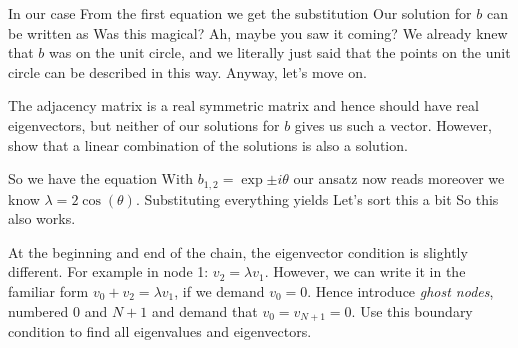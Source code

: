 In our case 
From the first equation we get the substitution 
\eq{
\lambda = 2 \cos(\theta)
}
Our solution for $b$ can be written as 
Was this magical? Ah, maybe you saw it coming? We already knew that $b$ was on the unit circle, and we literally just said that the points on the unit circle can be described in this way. Anyway, let's move on.  

\subquestion  
The adjacency matrix is a real symmetric matrix and hence should have real eigenvectors, but neither of our solutions for $b$ gives us such a vector. However, show that a linear combination of the solutions is also a solution.

\solution 
So we have the equation 
With $b_{1,2}=\exp{\pm i \theta}$ our ansatz now reads 
moreover we know $\lambda=2\cos(\theta)$. Substituting everything yields 
Let's sort this a bit 
So this also works. 

\subquestion At the beginning and end of the chain, the eigenvector condition is slightly different. For example in node 1: $v_2=\lambda v_1$. However, we can write it in the familiar form $v_0+v_2=\lambda v_1$, if we demand $v_0=0$. Hence introduce \textit{ghost nodes}, numbered 0 and $N+1$ and demand that $v_0=v_{N+1}=0$. Use this boundary condition to find all eigenvalues and eigenvectors. 

